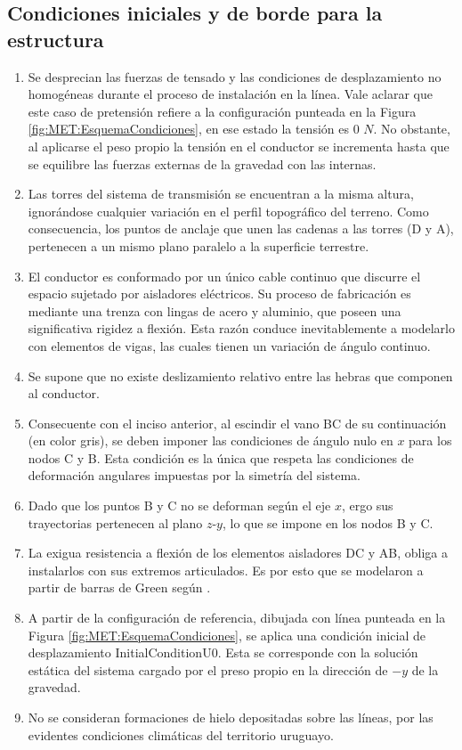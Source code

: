 \subsection{Condiciones iniciales y de borde para la estructura}\label{Sec:MET:ModeladoEstructural}
\begin{enumerate}
	\item  Se desprecian las fuerzas de tensado y las condiciones de desplazamiento no homogéneas durante el proceso de instalación en la línea. Vale aclarar que este caso de pretensión refiere a la configuración punteada en la Figura \ref{fig:MET:EsquemaCondiciones}, en ese estado la tensión es 0 $N$. No obstante, al aplicarse el peso propio la tensión en el conductor se incrementa hasta que se equilibre las fuerzas externas de la gravedad con las internas. 
	\item Las torres del sistema de transmisión se encuentran a la misma altura, ignorándose cualquier variación en el perfil topográfico del terreno. Como consecuencia, los puntos de anclaje que unen las cadenas a las torres (D y A), pertenecen a un mismo plano paralelo a la superficie terrestre.
	\item  El conductor es conformado por un único cable continuo que discurre el espacio sujetado por aisladores eléctricos. Su proceso de fabricación es mediante una trenza con lingas de acero y aluminio, que poseen una significativa rigidez a flexión. Esta razón conduce inevitablemente a modelarlo con elementos de vigas, las cuales tienen un variación de ángulo continuo.
	\item Se supone que no existe deslizamiento relativo entre las hebras que componen al conductor.  
	\item Consecuente con el inciso anterior, al escindir el vano BC de su continuación (en color gris), se deben imponer las condiciones de ángulo nulo en $x$ para los nodos C y B. Esta condición es la única que respeta las condiciones de deformación angulares impuestas por la simetría del sistema.
	\item Dado que los puntos B y C no se deforman según el eje $x$, ergo sus trayectorias pertenecen al plano $z$-$y$, lo que se impone en los nodos B y C. 
	\item La exigua resistencia a flexión de los elementos aisladores DC y AB, obliga a instalarlos con sus extremos articulados. Es por esto que se modelaron a partir de barras de Green según \cite{Crisfield}. 
	\item A partir de la configuración de referencia, dibujada con línea punteada en la Figura \ref{fig:MET:EsquemaCondiciones}, se aplica una condición inicial de desplazamiento \gls{InitialConditionU0}. Esta se corresponde con la solución estática del sistema cargado por el preso propio en la dirección de $-y$ de la gravedad.
	\item No se consideran formaciones de hielo depositadas sobre las líneas, por las evidentes condiciones climáticas del territorio uruguayo.
\end{enumerate} 


